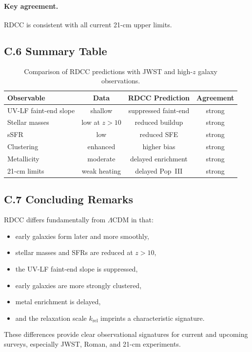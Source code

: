 \documentclass[11pt,a4paper]{article}
\begin{document}
\paragraph{Key agreement.}
RDCC is consistent with all current 21-cm upper limits.

\subsection*{C.6 Summary Table}

\begin{table}[H]
\centering
\begin{tabular}{lccc}
\hline
\textbf{Observable} & \textbf{Data} & \textbf{RDCC Prediction} & \textbf{Agreement} \\
\hline
UV-LF faint-end slope & shallow & suppressed faint-end & strong \\
Stellar masses & low at $z>10$ & reduced buildup & strong \\
sSFR & low & reduced SFE & strong \\
Clustering & enhanced & higher bias & strong \\
Metallicity & moderate & delayed enrichment & strong \\
21-cm limits & weak heating & delayed Pop~III & strong \\
\hline
\end{tabular}
\caption{Comparison of RDCC predictions with JWST and high-$z$ galaxy observations.}
\label{tab:comparisonCXXII}
\end{table}

\subsection*{C.7 Concluding Remarks}

RDCC differs fundamentally from $\Lambda$CDM in that:

\begin{itemize}
    \item early galaxies form later and more smoothly,
    \item stellar masses and SFRs are reduced at $z > 10$,
    \item the UV-LF faint-end slope is suppressed,
    \item early galaxies are more strongly clustered,
    \item metal enrichment is delayed,
    \item and the relaxation scale $k_{\mathrm{rel}}$ imprints a characteristic signature.
\end{itemize}

These differences provide clear observational signatures for current and upcoming surveys, 
especially JWST, Roman, and 21-cm experiments.


\nocite{*}

\end{document}
